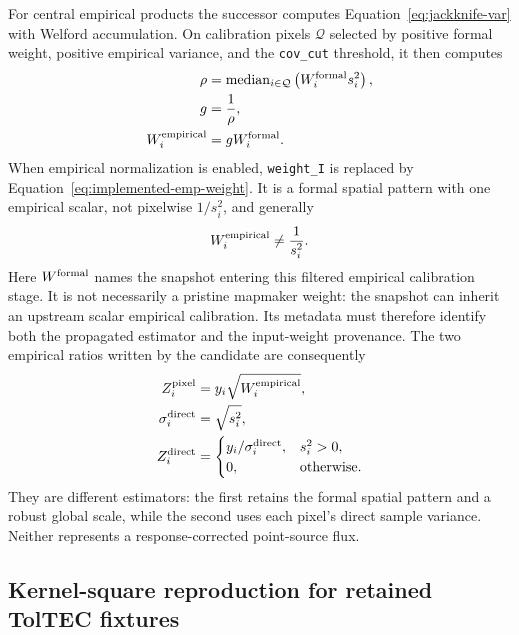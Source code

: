 \documentclass[11pt]{article}
\newcommand{\code}[1]{\nolinkurl{#1}}
\begin{document}
For central empirical products the successor computes
Equation~\eqref{eq:jackknife-var} with Welford accumulation.  On calibration
pixels $\mathcal Q$ selected by positive formal weight, positive empirical
variance, and the \code{cov_cut} threshold, it then computes
\begin{align}
 \rho&=\operatorname{median}_{i\in\mathcal Q}
        \left(W^{\rm formal}_i s_i^2\right),
 \label{eq:implemented-median-ratio}\\
 g&={1\over\rho},
 \label{eq:implemented-emp-scale}\\
 W_i^{\rm empirical}&=gW_i^{\rm formal}.
 \label{eq:implemented-emp-weight}
\end{align}
When empirical normalization is enabled, \code{weight_I} is replaced by
Equation~\eqref{eq:implemented-emp-weight}.  It is a formal spatial pattern
with one empirical scalar, not pixelwise $1/s_i^2$, and generally
\begin{equation}
 W_i^{\rm empirical}\ne{1\over s_i^2}.
 \label{eq:empirical-weight-not-pixelwise}
\end{equation}
Here $W^{\rm formal}$ names the snapshot entering this filtered empirical
calibration stage.  It is not necessarily a pristine mapmaker weight: the
snapshot can inherit an upstream scalar empirical calibration.  Its metadata
must therefore identify both the propagated estimator and the input-weight
provenance.
The two empirical ratios written by the candidate are consequently
\begin{align}
 Z_i^{\rm pixel}&=y_i\sqrt{W_i^{\rm empirical}},
 \label{eq:implemented-pixel-snr}\\
 \sigma_i^{\rm direct}&=\sqrt{s_i^2},
 \label{eq:implemented-direct-sigma}\\
 Z_i^{\rm direct}&=
 \begin{cases}y_i/\sigma_i^{\rm direct},&s_i^2>0,\\0,&\hbox{otherwise}.
 \end{cases}
 \label{eq:implemented-direct-snr}
\end{align}
They are different estimators: the first retains the formal spatial pattern
and a robust global scale, while the second uses each pixel's direct sample
variance.  Neither represents a response-corrected point-source flux.

\subsection{Kernel-square reproduction for retained TolTEC fixtures}
\end{document}

